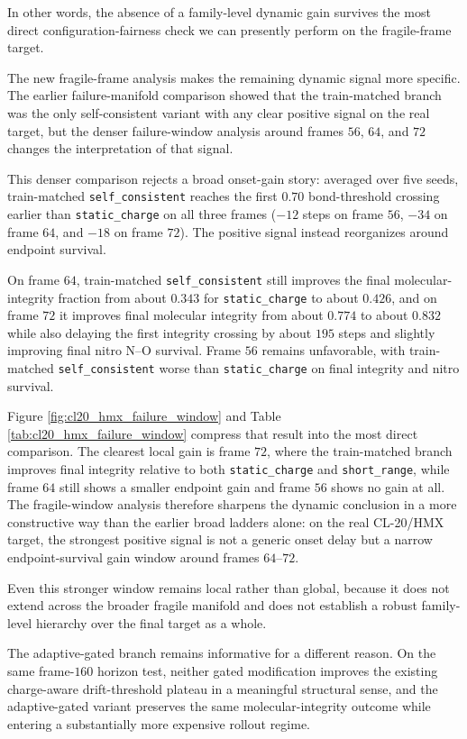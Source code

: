 In other words, the absence of a family-level dynamic gain survives the most direct configuration-fairness check we can presently perform on the fragile-frame target.

The new fragile-frame analysis makes the remaining dynamic signal more specific. The earlier failure-manifold comparison showed that the train-matched branch was the only self-consistent variant with any clear positive signal on the real target, but the denser failure-window analysis around frames $56$, $64$, and $72$ changes the interpretation of that signal.

This denser comparison rejects a broad onset-gain story: averaged over five seeds, train-matched \texttt{self\_consistent} reaches the first $0.70$ bond-threshold crossing earlier than \texttt{static\_charge} on all three frames ($-12$ steps on frame $56$, $-34$ on frame $64$, and $-18$ on frame $72$). The positive signal instead reorganizes around endpoint survival.

On frame $64$, train-matched \texttt{self\_consistent} still improves the final molecular-integrity fraction from about $0.343$ for \texttt{static\_charge} to about $0.426$, and on frame $72$ it improves final molecular integrity from about $0.774$ to about $0.832$ while also delaying the first integrity crossing by about $195$ steps and slightly improving final nitro N--O survival. Frame $56$ remains unfavorable, with train-matched \texttt{self\_consistent} worse than \texttt{static\_charge} on final integrity and nitro survival.

Figure \ref{fig:cl20_hmx_failure_window} and Table \ref{tab:cl20_hmx_failure_window} compress that result into the most direct comparison. The clearest local gain is frame $72$, where the train-matched branch improves final integrity relative to both \texttt{static\_charge} and \texttt{short\_range}, while frame $64$ still shows a smaller endpoint gain and frame $56$ shows no gain at all. The fragile-window analysis therefore sharpens the dynamic conclusion in a more constructive way than the earlier broad ladders alone: on the real CL-20/HMX target, the strongest positive signal is not a generic onset delay but a narrow endpoint-survival gain window around frames $64$--$72$.

Even this stronger window remains local rather than global, because it does not extend across the broader fragile manifold and does not establish a robust family-level hierarchy over the final target as a whole.

The adaptive-gated branch remains informative for a different reason. On the same frame-$160$ horizon test, neither gated modification improves the existing charge-aware drift-threshold plateau in a meaningful structural sense, and the adaptive-gated variant preserves the same molecular-integrity outcome while entering a substantially more expensive rollout regime.

